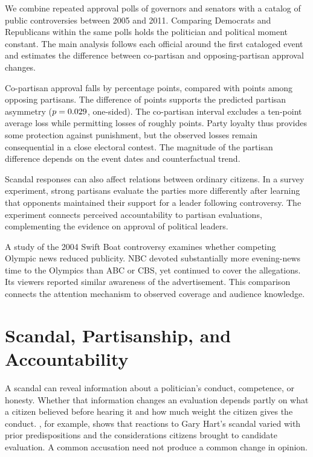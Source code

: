 \documentclass[11pt]{article}
\begin{document}
We combine repeated approval polls of governors and senators with a catalog of public controversies between 2005 and 2011. Comparing Democrats and Republicans within the same polls holds the politician and political moment constant. The main analysis follows each official around the first cataloged event and estimates the difference between co-partisan and opposing-partisan approval changes.

Co-partisan approval falls by \InPenalty{} percentage points, compared with \OutPenalty{} points among opposing partisans. The difference of \GapEstimate{} points supports the predicted partisan asymmetry ($p=0.029$, one-sided). The co-partisan interval excludes a ten-point average loss while permitting losses of roughly \LargestMainPenalty{} points. Party loyalty thus provides some protection against punishment, but the observed losses remain consequential in a close electoral contest. The magnitude of the partisan difference depends on the event dates and counterfactual trend.

Scandal responses can also affect relations between ordinary citizens. In a survey experiment, strong partisans evaluate the parties more differently after learning that opponents maintained their support for a leader following controversy. The experiment connects perceived accountability to partisan evaluations, complementing the evidence on approval of political leaders.

A study of the 2004 Swift Boat controversy examines whether competing Olympic news reduced publicity. NBC devoted substantially more evening-news time to the Olympics than ABC or CBS, yet continued to cover the allegations. Its viewers reported similar awareness of the advertisement. This comparison connects the attention mechanism to observed coverage and audience knowledge.

\section{Scandal, Partisanship, and Accountability}

A scandal can reveal information about a politician's conduct, competence, or honesty. Whether that information changes an evaluation depends partly on what a citizen believed before hearing it and how much weight the citizen gives the conduct. \citet{stoker1993}, for example, shows that reactions to Gary Hart's scandal varied with prior predispositions and the considerations citizens brought to candidate evaluation. A common accusation need not produce a common change in opinion.
\end{document}
